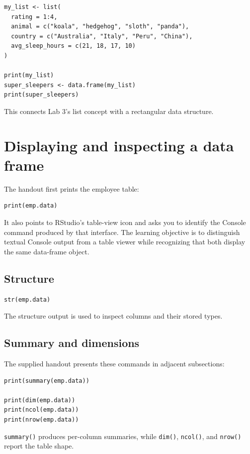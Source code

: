 \begin{lstlisting}[style=dsr]
my_list <- list(
  rating = 1:4,
  animal = c("koala", "hedgehog", "sloth", "panda"),
  country = c("Australia", "Italy", "Peru", "China"),
  avg_sleep_hours = c(21, 18, 17, 10)
)

print(my_list)
super_sleepers <- data.frame(my_list)
print(super_sleepers)
\end{lstlisting}

This connects Lab 3's list concept with a rectangular data structure.

\section{Displaying and inspecting a data frame}

The handout first prints the employee table:

\begin{lstlisting}[style=dsr]
print(emp.data)
\end{lstlisting}

It also points to RStudio's table-view icon and asks you to identify the Console command produced by that interface. The learning objective is to distinguish textual Console output from a table viewer while recognizing that both display the same data-frame object.

\subsection{Structure}

\begin{lstlisting}[style=dsr]
str(emp.data)
\end{lstlisting}

The structure output is used to inspect columns and their stored types.

\subsection{Summary and dimensions}

The supplied handout presents these commands in adjacent subsections:

\begin{lstlisting}[style=dsr]
print(summary(emp.data))

print(dim(emp.data))
print(ncol(emp.data))
print(nrow(emp.data))
\end{lstlisting}

\texttt{summary()} produces per-column summaries, while \texttt{dim()}, \texttt{ncol()}, and \texttt{nrow()} report the table shape.

